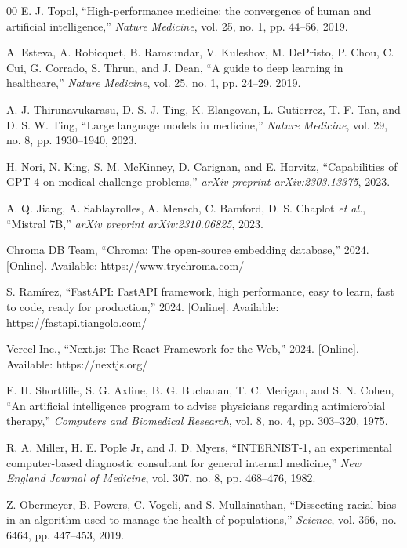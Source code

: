 \documentclass[12pt]{article}
\begin{document}
\begin{thebibliography}{00}
E. J. Topol, ``High-performance medicine: the convergence of human and artificial intelligence,'' \textit{Nature Medicine}, vol. 25, no. 1, pp. 44--56, 2019.

A. Esteva, A. Robicquet, B. Ramsundar, V. Kuleshov, M. DePristo, P. Chou, C. Cui, G. Corrado, S. Thrun, and J. Dean, ``A guide to deep learning in healthcare,'' \textit{Nature Medicine}, vol. 25, no. 1, pp. 24--29, 2019.

A. J. Thirunavukarasu, D. S. J. Ting, K. Elangovan, L. Gutierrez, T. F. Tan, and D. S. W. Ting, ``Large language models in medicine,'' \textit{Nature Medicine}, vol. 29, no. 8, pp. 1930--1940, 2023.

H. Nori, N. King, S. M. McKinney, D. Carignan, and E. Horvitz, ``Capabilities of GPT-4 on medical challenge problems,'' \textit{arXiv preprint arXiv:2303.13375}, 2023.

A. Q. Jiang, A. Sablayrolles, A. Mensch, C. Bamford, D. S. Chaplot \emph{et al.}, ``Mistral 7B,'' \textit{arXiv preprint arXiv:2310.06825}, 2023.

Chroma DB Team, ``Chroma: The open-source embedding database,'' 2024. [Online]. Available: https://www.trychroma.com/

S. Ramírez, ``FastAPI: FastAPI framework, high performance, easy to learn, fast to code, ready for production,'' 2024. [Online]. Available: https://fastapi.tiangolo.com/

Vercel Inc., ``Next.js: The React Framework for the Web,'' 2024. [Online]. Available: https://nextjs.org/

E. H. Shortliffe, S. G. Axline, B. G. Buchanan, T. C. Merigan, and S. N. Cohen, ``An artificial intelligence program to advise physicians regarding antimicrobial therapy,'' \textit{Computers and Biomedical Research}, vol. 8, no. 4, pp. 303--320, 1975.

R. A. Miller, H. E. Pople Jr, and J. D. Myers, ``INTERNIST-1, an experimental computer-based diagnostic consultant for general internal medicine,'' \textit{New England Journal of Medicine}, vol. 307, no. 8, pp. 468--476, 1982.

Z. Obermeyer, B. Powers, C. Vogeli, and S. Mullainathan, ``Dissecting racial bias in an algorithm used to manage the health of populations,'' \textit{Science}, vol. 366, no. 6464, pp. 447--453, 2019.


\end{thebibliography}
\end{document}
